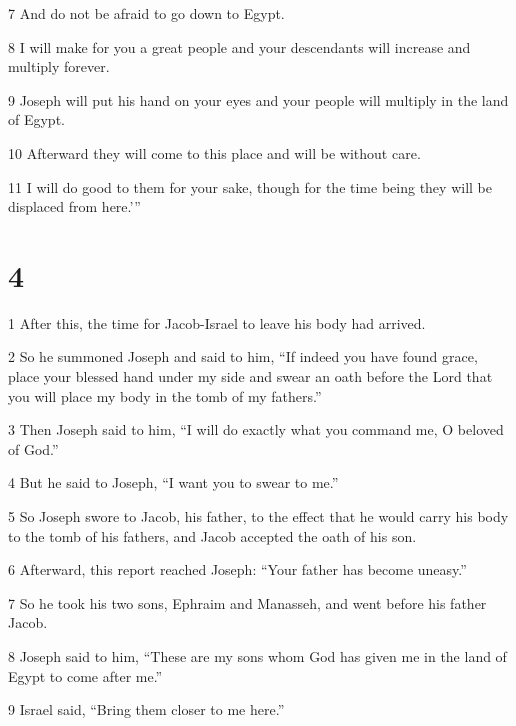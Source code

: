 \par 7 And do not be afraid to go down to Egypt. 

\par 8 I will make for you a great people and your descendants will increase and multiply forever. 

\par 9 Joseph will put his hand on your eyes and your people will multiply in the land of Egypt. 

\par 10 Afterward they will come to this place and will be without care. 

\par 11 I will do good to them for your sake, though for the time being they will be displaced from here.’” 

\chapter{4}

\par 1 After this, the time for Jacob-Israel to leave his body had arrived. 

\par 2 So he summoned Joseph and said to him, “If indeed you have found grace, place your blessed hand under my side and swear an oath before the Lord that you will place my body in the tomb of my fathers.” 

\par 3 Then Joseph said to him, “I will do exactly what you command me, O beloved of God.”

\par 4 But he said to Joseph, “I want you to swear to me.” 

\par 5 So Joseph swore to Jacob, his father, to the effect that he would carry his body to the tomb of his fathers, and Jacob accepted the oath of his son. 

\par 6 Afterward, this report reached Joseph: “Your father has become uneasy.” 

\par 7 So he took his two sons, Ephraim and Manasseh, and went before his father Jacob. 

\par 8 Joseph said to him, “These are my sons whom God has given me in the land of Egypt to come after me.” 

\par 9 Israel said, “Bring them closer to me here.” 

